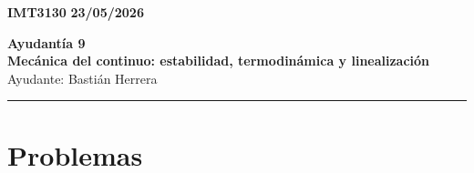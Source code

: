 \documentclass[11pt]{article}
\begin{document}
\begin{flushleft}
    \small
    \textbf{IMT3130} \hfill
    \textbf{23/05/2026}
\end{flushleft}
\begin{center}
    \LARGE\textbf{Ayudant\'ia 9}\\
    \vspace{3pt}
    \normalsize\textbf{Mec\'anica del continuo: estabilidad, termodin\'amica y linealizaci\'on}\\
    \normalsize Ayudante: Basti\'an Herrera 
    \rule{\textwidth}{0.05mm}
\end{center}

\section*{Problemas}
\end{document}
